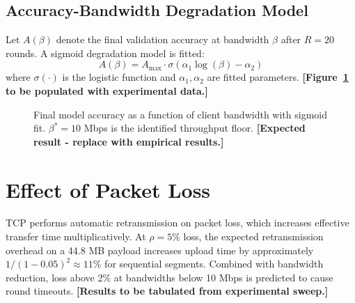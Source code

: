 \documentclass[12pt,a4paper]{report}
\begin{document}
\subsection{Accuracy-Bandwidth Degradation Model}

Let $A(\beta)$ denote the final validation accuracy at bandwidth $\beta$ after $R = 20$ rounds. A sigmoid degradation model is fitted:
\begin{equation}
  A(\beta) = A_{\max} \cdot \sigma\!\left(\alpha_1 \log(\beta) - \alpha_2\right)
  \label{eq:sigmoid_model}
\end{equation}
where $\sigma(\cdot)$ is the logistic function and $\alpha_1, \alpha_2$ are fitted parameters. \textbf{[Figure~\ref{fig:acc_vs_bw} to be populated with experimental data.]}

\begin{figure}[H]
\centering
{}
\caption{Final model accuracy as a function of client bandwidth with sigmoid fit. $\beta^* = 10$ Mbps is the identified throughput floor. \textbf{[Expected result - replace with empirical results.]}}
\label{fig:acc_vs_bw}
\end{figure}

\section{Effect of Packet Loss}

TCP performs automatic retransmission on packet loss, which increases effective transfer time multiplicatively. At $\rho = 5\%$ loss, the expected retransmission overhead on a 44.8 MB payload increases upload time by approximately $1/(1-0.05)^2 \approx 11\%$ for sequential segments. Combined with bandwidth reduction, loss above 2\% at bandwidths below 10 Mbps is predicted to cause round timeouts. \textbf{[Results to be tabulated from experimental sweep.]}
\end{document}
